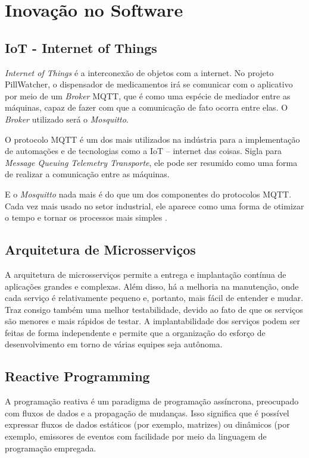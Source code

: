 \section{Inovação no Software}
\subsection {IoT - Internet of Things}
\textit{Internet of Things} é a interconexão de objetos com a internet. No projeto PillWatcher, o dispensador de medicamentos irá se comunicar com o aplicativo por meio de um \textit{Broker} MQTT, que é como uma espécie de mediador entre as máquinas, capaz de fazer com que a comunicação de fato ocorra entre elas. O \textit{Broker} utilizado será o \textit{Mosquitto}.

O protocolo MQTT é um dos mais utilizados na indústria para a implementação de automações e de tecnologias como a IoT – internet das coisas. Sigla para \textit{Message Queuing Telemetry Transporte}, ele pode ser resumido como uma forma de realizar a comunicação entre as máquinas.\cite{ENGPROCESS_2018}

E o \textit{Mosquitto} nada mais é do que um dos componentes do protocolos MQTT. Cada vez mais usado no setor industrial, ele aparece como uma forma de otimizar o tempo e tornar os processos mais simples \cite{ENGPROCESS_2018}.

\subsection {Arquitetura de Microsserviços}
A arquitetura de microsserviços permite a entrega e implantação contínua de aplicações grandes e complexas. Além disso, há a melhoria na manutenção, onde cada serviço é relativamente pequeno e, portanto, mais fácil de entender e mudar. Traz consigo também uma melhor testabilidade, devido ao fato de que os serviços são menores e mais rápidos de testar. A implantabilidade dos serviços podem ser feitas de forma independente e permite que a organização do esforço de desenvolvimento em torno de várias equipes seja autônoma.

\subsection {Reactive Programming}
A programação reativa é um paradigma de programação assíncrona, preocupado com fluxos de dados e a propagação de mudanças. Isso significa que é possível expressar fluxos de dados estáticos (por exemplo, matrizes) ou dinâmicos (por exemplo, emissores de eventos com facilidade por meio da  linguagem  de programação empregada. 

